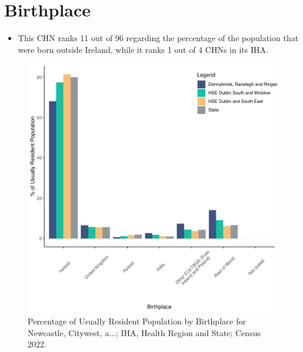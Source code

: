 \documentclass{article}
\begin{document}
\section{Birthplace}\label{sect:Birth}
\begin{itemize}
\item This CHN ranks  11 out of 96 regarding the percentage of the population that were born outside Ireland, while it ranks  1 out of 4 CHNs in its IHA.
\end{itemize}
\begin{figure}[H]
	\centering
	\includegraphics[width = 130mm]{../figures/BirthED.pdf}
	\caption{Percentage of Usually Resident Population by Birthplace for Newcastle, Citywest, a...; IHA, Health Region and State; Census 2022.}
	\label{fig:vbnv}
	\end{figure}
	
\end{document}
